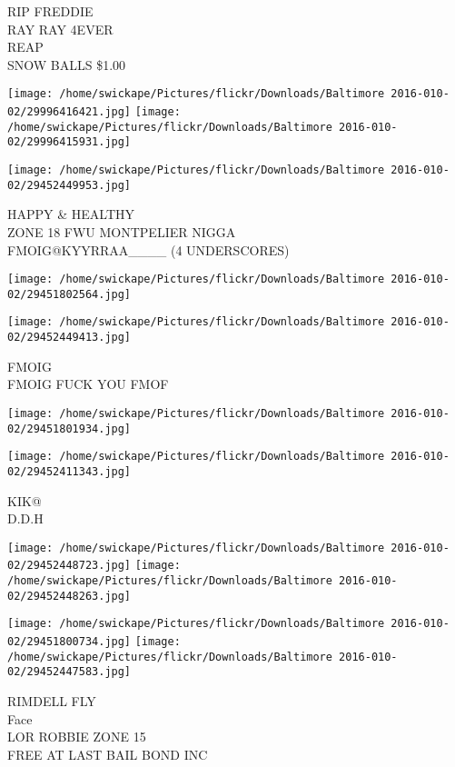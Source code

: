 \documentclass[10pt,letterpaper]{article}
\begin{document}
RIP FREDDIE\\
RAY RAY 4EVER\\
REAP\\
SNOW BALLS \$1.00\\
\pagebreak

\texttt{[image: /home/swickape/Pictures/flickr/Downloads/Baltimore 2016-010-02/29996416421.jpg]}
\texttt{[image: /home/swickape/Pictures/flickr/Downloads/Baltimore 2016-010-02/29996415931.jpg]}

\vspace{0.25in}
\texttt{[image: /home/swickape/Pictures/flickr/Downloads/Baltimore 2016-010-02/29452449953.jpg]}

HAPPY \& HEALTHY\\
ZONE 18 FWU MONTPELIER NIGGA\\
FMOIG@KYYRRAA\_\_\_\_ (4 UNDERSCORES)\\
\pagebreak

\texttt{[image: /home/swickape/Pictures/flickr/Downloads/Baltimore 2016-010-02/29451802564.jpg]}

\vspace{0.25in}
\texttt{[image: /home/swickape/Pictures/flickr/Downloads/Baltimore 2016-010-02/29452449413.jpg]}

FMOIG\\
FMOIG FUCK YOU FMOF\\
\pagebreak

\texttt{[image: /home/swickape/Pictures/flickr/Downloads/Baltimore 2016-010-02/29451801934.jpg]}

\vspace{0.25in}
\texttt{[image: /home/swickape/Pictures/flickr/Downloads/Baltimore 2016-010-02/29452411343.jpg]}

KIK@\\
D.D.H\\
\pagebreak

\texttt{[image: /home/swickape/Pictures/flickr/Downloads/Baltimore 2016-010-02/29452448723.jpg]}
\texttt{[image: /home/swickape/Pictures/flickr/Downloads/Baltimore 2016-010-02/29452448263.jpg]}

\texttt{[image: /home/swickape/Pictures/flickr/Downloads/Baltimore 2016-010-02/29451800734.jpg]}
\texttt{[image: /home/swickape/Pictures/flickr/Downloads/Baltimore 2016-010-02/29452447583.jpg]}

RIMDELL FLY\\
Face\\
LOR ROBBIE ZONE 15\\
FREE AT LAST BAIL BOND INC\\
\pagebreak
\end{document}
